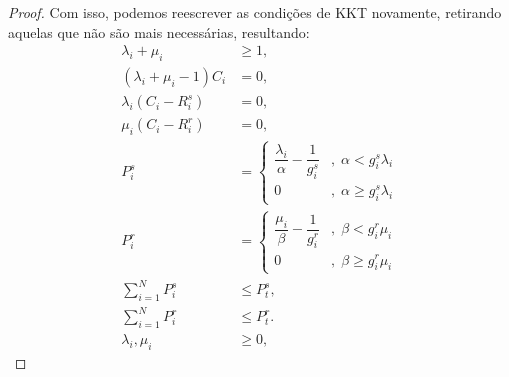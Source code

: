 \begin{proof}
    Com isso, podemos reescrever as condições de \ac{KKT} novamente, retirando aquelas que não são mais necessárias, resultando:
    \begin{subequations}\label{eq:kkt_prob3}
            \begin{align}
                    \lambda_i + \mu_i &\geq 1, \label{eq:kkt_prob3_a}\\
                    (\lambda_i + \mu_i - 1) C_i &= 0, \label{eq:kkt_prob3_b}\\
                    \lambda_i(C_i - R_i^s) &= 0, \label{eq:kkt_prob3_c}\\
                    \mu_i(C_i - R_i^r) &= 0, \label{eq:kkt_prob3_d}\\
                    P_i^s&=
                      \begin{cases}
                        \dfrac{\lambda_i}{\alpha} - \dfrac{1}{g_i^s} &,\; \alpha < g_i^s\lambda_i\\
                        0 &,\; \alpha \geq g_i^s\lambda_i
                      \end{cases}\label{eq:kkt_prob3_e}\\
                    P_i^r&=
                      \begin{cases}         
                        \dfrac{\mu_i}{\beta} - \dfrac{1}{g_i^r} &,\; \beta < g_i^r\mu_i\\
                        0 &,\; \beta \geq g_i^r\mu_i
                      \end{cases}\label{eq:kkt_prob3_f}\\                
                    \sum_{i=1}^N P_i^s &\leq P_{t}^s, \label{eq:kkt_prob3_g}\\
                    \sum_{i=1}^N P_i^r &\leq P_{t}^r. \label{eq:kkt_prob3_j}\\
                    \lambda_i,\mu_i &\geq 0, \label{eq:kkt_prob3_k}
            \end{align}
    \end{subequations}


\end{proof}
